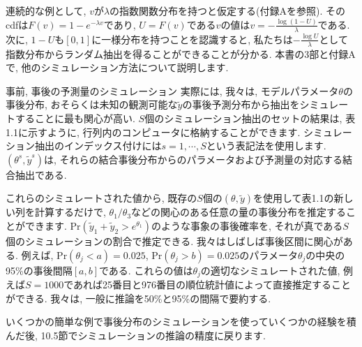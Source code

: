 \documentclass[10pt,dvipdfmx,a4]{beamer}
\begin{document}

\begin{frame}
連続的な例として, $v$が$\lambda$の指数関数分布を持つと仮定する(付録Aを参照).
そのcdfは$F(v)=1-e^{-\lambda v}$であり, $U=F(v)$である$v$の値は$v=-\frac{\log(1-U)}{\lambda}$である.
次に, $1-U$も$[0, 1]$に一様分布を持つことを認識すると, 私たちは$-\frac{\log U}{\lambda}$として指数分布からランダム抽出を得ることができることが分かる.
本書の3部と付録Aで, 他のシミュレーション方法について説明します.
\end{frame}


\begin{frame}{事前, 事後の予測量のシミュレーション}
実際には, 我々は, モデルパラメータ$\theta$の事後分布, おそらくは未知の観測可能な$\tilde{y}$の事後予測分布から抽出をシミュレートすることに最も関心が高い.
$S$個のシミュレーション抽出のセットの結果は, 表1.1に示すように, 行列内のコンピュータに格納することができます.
シミュレーション抽出のインデックス付けには$s=1,\cdots,S$という表記法を使用します.
$(\theta^s,\tilde{y}^s)$は, それらの結合事後分布からのパラメータおよび予測量の対応する結合抽出である.

これらのシミュレートされた値から, 既存の$S$個の$(\theta,\tilde{y})$を使用して表1.1の新しい列を計算するだけで, $\theta_1/\theta_3$などの関心のある任意の量の事後分布を推定することができます.
$\text{Pr}(\tilde{y}_1+\tilde{y}_2>e^{\theta_1})$のような事象の事後確率を, それが真である$S$個のシミュレーションの割合で推定できる.
我々はしばしば事後区間に関心がある.
例えば, $\text{Pr}(\theta_j<a)=0.025$, $\text{Pr}(\theta_j>b)=0.025$のパラメータ$\theta_j$の中央の95\%の事後間隔$[a, b]$である.
これらの値は$\theta_j$の適切なシミュレートされた値, 例えば$S=1000$であれば25番目と976番目の順位統計値によって直接推定することができる.
我々は, 一般に推論を50\%と95\%の間隔で要約する.

いくつかの簡単な例で事後分布のシミュレーションを使っていくつかの経験を積んだ後, 10.5節でシミュレーションの推論の精度に戻ります.
\end{frame}

\end{document}

